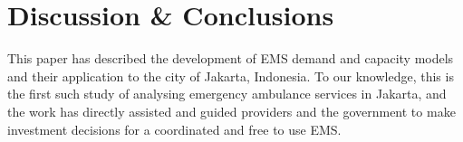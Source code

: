 \documentclass[preprint,12pt]{elsarticle}
\begin{document}




\section{Discussion \& Conclusions}\label{sec:discussion}
This paper has described the development of EMS demand and capacity models and
their application to the city of Jakarta, Indonesia. To our knowledge, this is
the first such study of analysing emergency ambulance services in Jakarta, and
the work has directly assisted and guided providers and the government to make
investment decisions for a coordinated and free to use EMS.
\end{document}
